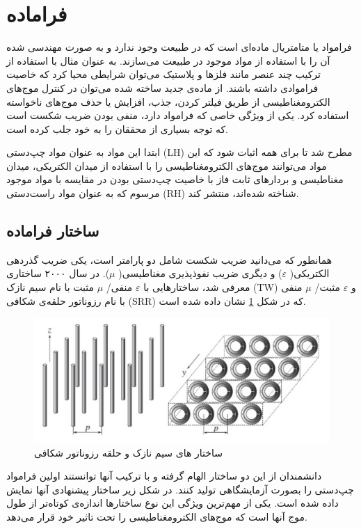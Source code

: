  
\section{فراماده}
 فرامواد یا متامتریال
  ماده‌ای است که در طبیعت وجود ندارد و به صورت مهندسی شده آن را با استفاده از مواد موجود در طبیعت می‌سازند. به عنوان مثال با استفاده از ترکیب چند عنصر مانند فلزها و پلاستیک می‌توان شرایطی محیا کرد که خاصیت فراموادی داشته باشند. از ماده‌ی جدید ساخته شده می‌توان در کنترل موج‌های الکترومغناطیسی از طریق فیلتر کردن، جذب، افزایش یا حذف موج‌های ناخواسته استفاده کرد. یکی از ویژگی خاصی که فرامواد دارد، منفی بودن ضریب شکست است که توجه بسیاری از محققان را به خود جلب کرده است. 
  
  
  ابتدا این مواد به عنوان مواد چپ‌دستی (LH) مطرح شد تا برای همه اثبات شود که این مواد می‌توانند موج‌های الکترومغناطیسی را با استفاده از میدان الکتریکی، میدان مغناطیسی و بردارهای ثابت فاز با خاصیت‌ چپ‌دستی بودن در مقایسه با مواد موجود مرسوم که به عنوان مواد راست‌دستی (RH) شناخته شده‌اند، منتشر کند.
  
  
\subsection{ساختار فراماده}
 
 همانطور که می‌دانید ضریب شکست شامل دو پارامتر است، یکی ضریب گذردهی الکتریکی(
 $\varepsilon$)
  و دیگری ضریب نفوذ‌پذیری مغناطیسی(
  $\mu$).
   در سال ۲۰۰۰ ساختاری معرفی شد، ساختارهایی با 
   $\varepsilon$
   منفی/ 
   $\mu$
   مثبت با نام سیم نازک (TW) و
   $\varepsilon$
    مثبت/
    $\mu$
     منفی با نام رزوناتور حلقه‌ی شکافی (SRR) که در شکل 
     \ref{fig33}
      نشان داده شده است.
 
  \begin{figure}
 	\centering
 	\includegraphics[scale=0.3]{Images/fig33.png}
 	\caption{ساختار های سیم نازک و حلقه رزوناتور شکافی}
 	\label{fig33}
 \end{figure}
 
 
 دانشمندان از این دو ساختار الهام گرفته و با ترکیب آنها توانستند اولین فرامواد چپ‌دستی را بصورت آزمایشگاهی تولید کنند. در شکل زیر ساختار پیشنهادی آنها نمایش داده شده است. یکی از مهم‌ترین ویژگی این نوع ساختار‌ها اندازه‌ی کوتاه‌تر از طول موج آنها است که موج‌های الکترومغناطیسی را تحت تاثیر خود قرار می‌دهد.
 
